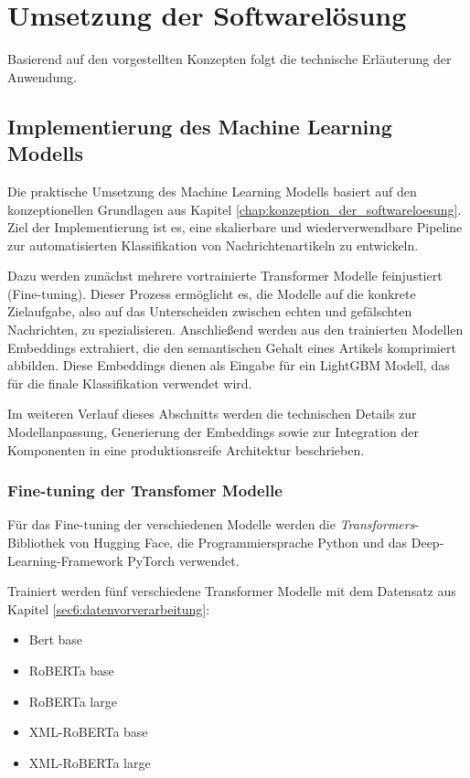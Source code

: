 \chapter{Umsetzung der Softwarelösung}
\label{chap:umsetzung_des_prototyps}

Basierend auf den vorgestellten Konzepten folgt die technische Erläuterung der Anwendung.

\section{Implementierung des Machine Learning Modells}

Die praktische Umsetzung des Machine Learning Modells basiert auf den konzeptionellen Grundlagen aus Kapitel \ref{chap:konzeption_der_softwareloesung}. 
Ziel der Implementierung ist es, eine skalierbare und wiederverwendbare Pipeline zur automatisierten Klassifikation von Nachrichtenartikeln zu entwickeln.

Dazu werden zunächst mehrere vortrainierte Transformer Modelle feinjustiert (Fine-tuning). 
Dieser Prozess ermöglicht es, die Modelle auf die konkrete Zielaufgabe, also auf das Unterscheiden zwischen echten und gefälschten Nachrichten, zu spezialisieren. 
Anschließend werden aus den trainierten Modellen Embeddings extrahiert, die den semantischen Gehalt eines Artikels komprimiert abbilden. 
Diese Embeddings dienen als Eingabe für ein LightGBM Modell, das für die finale Klassifikation verwendet wird.

Im weiteren Verlauf dieses Abschnitts werden die technischen Details zur Modellanpassung, Generierung der Embeddings sowie zur Integration der Komponenten in eine 
produktionsreife Architektur beschrieben.

\subsection{Fine-tuning der Transfomer Modelle}

Für das Fine-tuning der verschiedenen Modelle werden die \textit{Transformers}-Bibliothek von Hugging Face, die Programmiersprache Python und das Deep-Learning-Framework 
PyTorch verwendet.

Trainiert werden fünf verschiedene Transformer Modelle mit dem Datensatz aus Kapitel \ref{sec6:datenvorverarbeitung}:
\begin{itemize}
    \item Bert base
    \item RoBERTa base
    \item RoBERTa large
    \item XML-RoBERTa base
    \item XML-RoBERTa large
\end{itemize}

